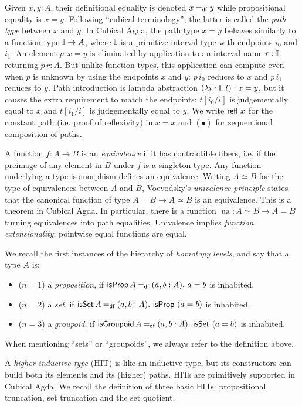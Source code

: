\documentclass[runningheads]{llncs}
\begin{document}
Given $x, y : A$, their definitional equality is denoted $x \mathbin{=_\mathsf{df}} y$ while propositional equality is $x = y$.
Following ``cubical terminology'', the latter is called the \emph{path type} between $x$ and $y$.
In Cubical Agda, the path type $x = y$ behaves similarly to a function type $\mathbb{I} \to A$, where $\mathbb{I}$ is a primitive interval type with endpoints $i_0$ and $i_1$.
An element $p : x = y$ is eliminated by application to an interval name $r : \mathbb{I}$, returning $p \, r : A$.
But unlike function types, this application can compute even when $p$ is unknown by using the endpoints $x$ and $y$: $p \,i_0$ reduces to $x$ and $p \,i_1$ reduces to $y$.
Path introduction is lambda abstraction $(\lambda i : \mathbb{I}.\,t) : x = y$, but it causes the extra requirement to match the endpoints: $t[i_0 / i]$ is judgementally equal to $x$ and $t[i_1 / i]$ is judgementally equal to  $y$. We write $\operatorname{\mathsf{refl}}\,x$ for the constant path (i.e. proof of reflexivity) in $x = x$ and $(\bullet)$ for sequentional composition of paths.

A function $f : A \to B$ is an \emph{equivalence} if it has contractible fibers, i.e. if the preimage of any element in $B$ under $f$ is a singleton type. Any function underlying a type isomorphism defines an equivalence. Writing $A \simeq B$ for the type of equivalences between $A$ and $B$, Voevodsky's \emph{univalence principle} states that the canonical function of type $A = B \to A \simeq B$ is an equivalence. This is a theorem in Cubical Agda. In particular, there is a function $\operatorname{ua} : A \simeq B \to A = B$ turning equivalences into path equalities. Univalence implies \emph{function extensionality}: pointwise equal functions are equal.

We recall the first instances of the hierarchy of \emph{homotopy levels}, and say that a type $A$ is:
\begin{itemize}
  \item ($n = 1$) a \emph{proposition}, if
    $\operatorname{\mathsf{isProp}} A \mathbin{=_\mathsf{df}} (a , b : A)\mathpunct{.}\, a = b$ is inhabited,
  \item ($n = 2$) a \emph{set}, if
    $\operatorname{\mathsf{isSet}} A \mathbin{=_\mathsf{df}} (a, b : A)\mathpunct{.}\, \operatorname{\mathsf{isProp}} \ (a = b)$ is inhabited,
  \item ($n = 3$) a \emph{groupoid}, if
    $\operatorname{\mathsf{isGroupoid}} A \mathbin{=_\mathsf{df}} (a, b : A)\mathpunct{.}\, \operatorname{\mathsf{isSet}} \ (a = b)$ is inhabited.
\end{itemize}
When mentioning \enquote{sets} or \enquote{groupoids}, we always refer to the definition above.

A \emph{higher inductive type} (HIT) is like an inductive type, but its constructors can build both its elements and its (higher) paths. HITs are primitively supported in Cubical Agda. We recall the definition of three basic HITs: propositional truncation, set truncation and the set quotient. 
\end{document}

